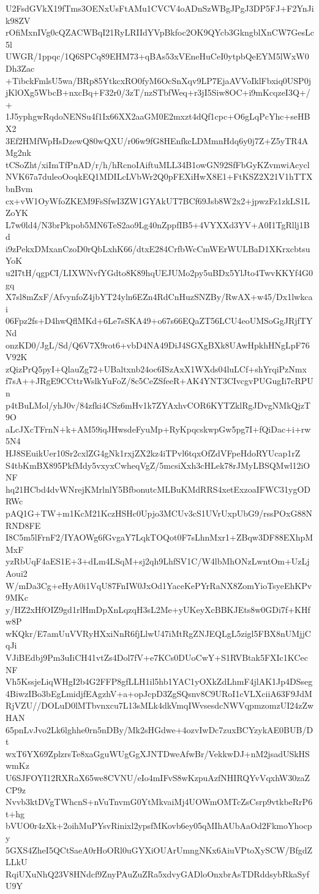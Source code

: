 U2FsdGVkX19fTms3OENxUsFtAMu1CVCV4oADnSzWBgJPgJ3DP5FJ+F2YnJik98ZV
rOfiMxnIVg0cQZACWBqI21RyLRIIdYVpBkfoc2OK9QYcb3GkngblXnCW7GesLc5l
UWGR/1ppqc/1Q6SPCq89EHM73+qBAs53xVEneHuCeI0ytpbQeEYM5lWxW0Dh3Zac
+TibckFmlsU5wa/BRp85YtkcxRO0fyM6OcSnXqv9LP7EjaAVVoIklFbxiq0USP0j
jKlOXg5WbcB+nxcBq+F32r0/3zT/nzSTbfWeq+r3jI5Siw8OC+i9mKcqzeI3Q+/+
1J5yphgwRqdoNENSu4f1Ix66XX2aaGM0E2mxzt4dQf1cpc+O6gLqPcYhc+seHBX2
3Ef2HMfWpHsDzewQ80wQXU/r06w9fG8HEnfkcLDMmnHdq6y0j7Z+Z5yTR4AMg2nk
tCSoZht/xiImTfPnAD/r/h/hRcnoIAiftuMLL34B1owGN92SfFbGyKZvmwiAcycl
NVK67a7duleoOoqkEQ1MDILcLVbWr2Q0pFEXiHwX8E1+FtKSZ2X21V1hTTXbnBvm
cx+vW1OyWfoZKEM9FsSfwI3ZW1GYAkUT7BCf69Jsb8W2x2+jpwzFz1zkLS1LZoYK
L7w0ld4/N3brPkpob5MN6TeS2ao9Lg40nZppfIB5+4VYXXd3YV+A0I1TgRllj1Bd
i9zPekxDMxanCzoD0rQbLxhK66/dtxE284CrfbWcCmWErWULBaD1XKrxcbtsuYoK
u2I7tH/qgpCI/LIXWNvfYGdto8K89hqUEJUMo2py5uBDx5YlJto4TwvKKYf4G0gq
X7sl8mZxF/AfvynfoZ4jbYT24yln6EZn4RdCnHuzSNZBy/RwAX+w45/Dx1lwkcai
06Fpz2fs+D4hwQflMKd+6Le7sSKA49+o67s66EQaZT56LCU4eoUMSoGgJRjfTYNd
onzKD0/JgL/Sd/Q6V7X9rot6+vbD4NA49DiJ4SGXgBXk8UAwHpkhHNgLpF76V92K
zQizPrQ5pyI+QlauZg72+UBaltxnb24oc6ISzAxX1WXds04luLCf+shYrqiPzNmx
f7sA++JRgE9CCttrWslkYuFoZ/8c5CeZSfeeR+AK4YNT3CIvcgvPUGugIi7cRPUn
p4tBuLMol/yhJ0v/84zfki4CSz6mHv1k7ZYAxhvCOR6KYTZklRgJDvgNMkQjzT9O
aLcJXcTFrnN+k+AM59iqJHwsdeFyuMp+RyKpqcskwpGw5pg7I+fQiDac+i+rw5N4
HJ8SEuikUer10Sr2cxlZG4gNk1rxjZX2kz4iTPvl6tqxOfZdVFpeHdoRYUcap1rZ
S4tbKmBX895PkfMdy5vxyxCwheqVgZ/5mcsiXxh3cHLek78rJMyLBSQMwl12iONF
hq21HCbd4dvWNrejKMrlnlY5BfbonutcMLBuKMdRRS4xetExzoaIFWC31ygODRWc
pAQ1G+TW+m1KcM21KczHSHc0Upjo3MCUv3cS1UVrUxpUbG9/rssPOxG88NRND8FE
I8C5m5lFrnF2/IYAOWg6fGvgaY7LqkTOQot0F7sLhnMxr1+ZBqw3DF88EXhpMMxF
yzRbUqF4aES1E+3+dLm4LSqM+sj2qh9LhfSV1C/W4lbMhONzLwntOm+UzLjAoui2
W/mDa3Cg+eHyA0i1VqU87FnIW0JxOd1YaceKePYrRaNX8ZomYioTsyeEhKPv9MKc
y/HZ2xHfOIZ9gd1rlHmDpXnLqzqH3sL2Me+yUKeyXcBBKJEts8w0GDi7f+KHfw8P
wKQkr/E7amUuVVRyHXxiNnR6fjLlwU47iMtRgZNJEQLgL5zigl5FBX8nUMjjCqJi
VJiBEdbj9Pm3uIiCH41vtZs4Dol7fV+e7KCs0DUoCwY+S1RVBtak5FXIc1KCecNF
Vh5KssjeLiqWHgI2b4G2FFP8gfLLH1il5hb1YAC1yOXkZdLhmF4jlAK1Jp4DSseg
4BiwzIBo3bEgLmidjfEAgzhV+a+opJcpD3ZgSQsnv8C9URoI1cVLXciiA63F9JdM
RjVZU//DOLuD0lMTbvnxcu7L13sMLk4dkVmqIWvsesdcNWVqpmzomzUI24zZwHAN
65pnLvJvo2Lk6lghhe0rn5nDBy/Mk2sHGdwe+4ozvIwDc7zuxBCYzykAE0BUB/Dt
wxT6YX69ZplzrsTe8xaGguWUgGgXJNTDweAfwBr/VekkwDJ+nM2jsadUSkHSwmKz
U6SJFOYI12RXRaX65we8CVNU/eIo4mIFvS8wKzpuAzfNHIRQYvVqxhW30zaZCP9z
Nvvb3ktDVgTWhcnS+nVuTnvmG0YtMkvaiMj4UOWmOMTcZsCsrp9vtkbeRrP6t+hg
bVUO0r4zXk+2oihMuPYsvRinixl2ypsfMKovb6ey05qMIhAUbAaOd2FkmoYhocpy
5GXS4ZheI5QCtSaeA0rHoORl0uGYXiOUArUmngNKx6AiuVPtoXySCW/BfgdZLLkU
RqiUXuNhQ23V8HNdcf9ZnyPAuZuZRa5xdvyGADloOnxbrAsTDRddsybRkaSyfU9Y

